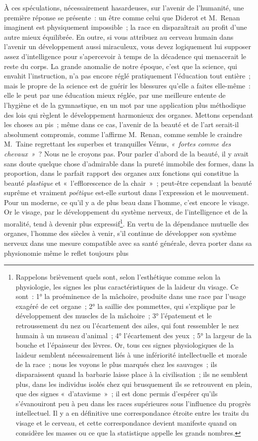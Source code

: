 \documentclass[french,twoside]{book} %
\begin{document}
À ces spéculations, nécessairement hasardeuses, sur l’avenir de l’humanité, une première réponse se présente : un être comme celui que Diderot et M. Renan imaginent est physiquement impossible ; la race en disparaîtrait au profit d’une autre mieux équilibrée. En outre, si vous attribuez au cerveau humain dans l’avenir un développement aussi miraculeux, vous devez logiquement lui supposer assez d’intelligence pour s’apercevoir à temps de la décadence qui menacerait le reste du corps. La grande anomalie de notre époque, c’est que la science, qui envahit l’instruction, n’a pas encore réglé pratiquement l’éducation tout entière ; mais le propre de la science est de guérir les blessures qu’elle a faites elle-même : elle le peut par une éducation mieux réglée, par une meilleure entente de l’hygiène et de la gymnastique, en un mot par une application plus méthodique des lois qui règlent le développement harmonieux des organes. Mettons cependant les choses au pis ; même dans ce cas, l’avenir de la beauté et de l’art serait-il absolument compromis, comme l’affirme M. Renan, comme semble le craindre M. Taine regrettant les superbes et tranquilles Vénus, \emph{« fortes comme des chevaux »} ?  Nous ne le croyons pas. Pour parler d’abord de la beauté, il y avait sans doute quelque chose d’admirable dans la pureté immobile des formes, dans la proportion, dans le parfait rapport des organes aux fonctions qui constitue la beauté \emph{plastique} et « l’efflorescence de la chair » ; peut-être cependant la beauté suprême et vraiment \emph{poétique} est-elle surtout dans l’expression et le mouvement. Pour un moderne, ce qu’il y a de plus beau dans l’homme, c’est encore le visage. Or le visage, par le développement du système nerveux, de l’intelligence et de la moralité, tend à devenir plus expressif\footnote{Rappelons brièvement quels sont, selon l’esthétique comme selon la physiologie, les signes les plus caractéristiques de la laideur du visage. Ce sont : 1° la proéminence de la mâchoire, produite dans une race par l’usage exagéré de cet organe ; 2° la saillie des pommettes, qui s’explique par le développement des muscles de la mâchoire ; 3° l’épatement et le retroussement du nez ou l’écartement des ailes, qui font ressembler le nez humain à un museau d’animal ; 4° l’écartement des yeux ; 5° la largeur de la bouche et l’épaisseur des lèvres. Or, tous ces signes physiologiques de la laideur semblent nécessairement liés à une infériorité intellectuelle et morale de la race ; nous les voyons le plus marqués chez les sauvages ; ils disparaissent quand la barbarie laisse place à la civilisation ; ils ne semblent plus, dans les individus isolés chez qui brusquement ils se retrouvent en plein, que des signes « d’atavisme » ; il est donc permis d’espérer qu’ils s’évanouiront peu à peu dans les races supérieures sous l’influence du progrès intellectuel. Il y a en définitive une correspondance étroite entre les traits du visage et le cerveau, et cette correspondance devient manifeste quand on considère les masses ou ce que la statistique appelle les grands nombres.}. En vertu de la dépendance mutuelle des organes, l’homme des siècles à venir, s’il continue de développer son système nerveux dans une mesure compatible avec sa santé générale, devra porter dans sa physionomie même le reflet toujours plus 
\end{document}
